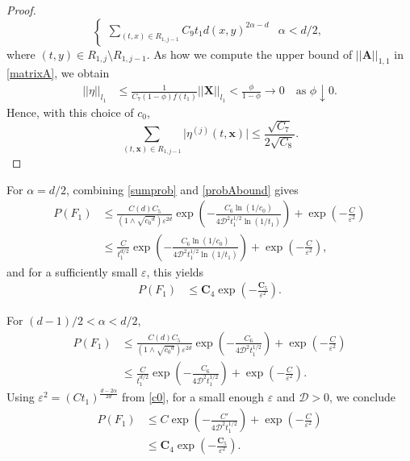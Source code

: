 \documentclass[12pt]{amsart}
\numberwithin{equation}{section}
\newcommand{\1}{\mathbf{1}}
\begin{document}
\begin{proof}
\begin{equation*}
\begin{cases}
    \sum\limits_{(t,x)\in R_{1,j-1}}C_9t_1d(x,y)^{2\alpha-d}&\alpha<d/2,
\end{cases}
\end{equation*}
where $(t,y)\in R_{1,j}\setminus R_{1,j-1}$. As how we compute the upper bound of $\vert\vert\textbf{A}\vert\vert_{1,1}$ in \eqref{matrixA}, we obtain
\begin{equation*}
\begin{split}
\vert\vert\eta\vert\vert_{l_1}&\leq \frac{1}{C_7(1-\phi)f(t_1)}\vert\vert\textbf{X}\vert\vert_{l_1}<\frac{\phi}{1-\phi}\rightarrow 0 \quad \text{as } \phi \downarrow 0.
\end{split}
\end{equation*}
Hence, with this choice of $c_0$,
\begin{equation*}
\sum_{(t,\textbf{x})\in R_{1,j-1}}\vert\eta^{(j)}(t,\textbf{x})\vert\leq \frac{\sqrt{C_7}}{2\sqrt{C_8}}.
\end{equation*}
\end{proof}

For $\alpha=d/2$, combining \eqref{sumprob} and \eqref{probAbound} gives
\begin{equation*}
\begin{split}
P(F_{1})&\leq \frac{C(d)C_5}{(1\wedge \sqrt{{c_0}^d})\varepsilon^{2d}}\exp\left(-\frac{C_6\ln(1/c_0)}{4\mathcal{D}^2t_1^{1/2}\ln(1/t_1)}\right)+\exp\left(-\frac{C}{\varepsilon^2}\right)\\
&\leq \frac{C}{t_1^{d/2}}\exp\left(-\frac{C_6\ln(1/c_0)}{4\mathcal{D}^2t_1^{1/2}\ln(1/t_1)}\right)+\exp\left(-\frac{C}{\varepsilon^2}\right),
\end{split}
\end{equation*}
and for a sufficiently small $\varepsilon$, this yields
\begin{align*}
P(F_1)&\leq \textbf{C}_4\exp\left(-\frac{\textbf{C}_5}{\varepsilon^2}\right).
\end{align*}

For $(d-1)/2<\alpha<d/2$, 
\begin{equation*}
\begin{split}
P(F_{1})&\leq \frac{C(d)C_5}{(1\wedge \sqrt{{c_0}^d})\varepsilon^{2d}}\exp\left(-\frac{C_6}{4\mathcal{D}^2t_1^{1/2}}\right)+\exp\left(-\frac{C}{\varepsilon^2}\right)\\
&\leq \frac{C}{t_1^{d/2}}\exp\left(-\frac{C_6}{4\mathcal{D}^2t_1^{1/2}}\right)+\exp\left(-\frac{C}{\varepsilon^2}\right).
\end{split}
\end{equation*}
Using $\varepsilon^2=\left(Ct_1\right)^{\frac{d-2\alpha}{2d}}$ from \eqref{c0}, for a small enough $\varepsilon$ and $\mathcal{D}>0$, we conclude
\begin{align*}
P(F_1)&\leq C\exp\left(-\frac{C'}{4\mathcal{D}^2t_1^{1/2}}\right)+\exp\left(-\frac{C}{\varepsilon^2}\right)\\
&\leq\textbf{C}_4\exp\left(-\frac{\textbf{C}_5}{\varepsilon^2}\right).
\end{align*}
\end{document}
